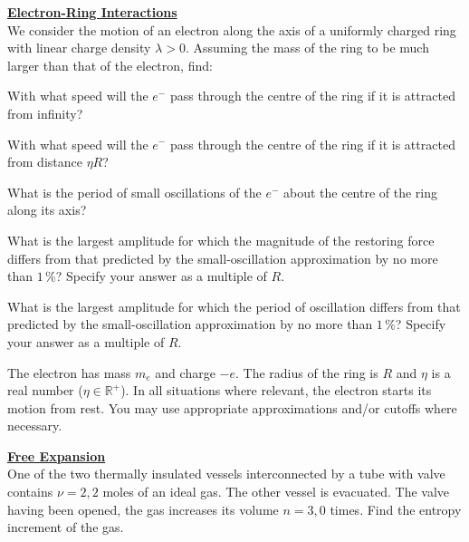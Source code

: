 \documentclass[a4paper]{article}
\begin{document}
	\Problem
	\textbf{\underline{Electron-Ring Interactions}}
	\\
	We consider the motion of an electron along the axis of a uniformly charged ring with linear charge density $\lambda > 0$. Assuming the mass of the ring to be much larger than that of the electron, find:
	\begin{description}[leftmargin=!, labelwidth=\widthof{$\bullet$}]
		\item[$\bullet$] With what speed will the $e^-$ pass through the centre of the ring if it is attracted from infinity?
		\item[$\bullet$] With what speed will the $e^-$ pass through the centre of the ring if it is attracted from distance $\eta R$?
		\item[$\bullet$] What is the period of small oscillations of the $e^-$ about the centre of the ring along its axis?
		\item[$\bullet$] What is the largest amplitude for which the magnitude of the restoring force differs from that predicted by the small-oscillation approximation by no more than $1\,\%$? Specify your answer as a multiple of $R$.
		\item[$\bullet$] What is the largest amplitude for which the period of oscillation differs from that predicted by the small-oscillation approximation by no more than $1\,\%$? Specify your answer as a multiple of $R$.
	\end{description}
	The electron has mass $m_e$ and charge $-e$. The radius of the ring is $R$ and $\eta$ is a real number ($\eta \in \mathbb{R}^+$). In all situations where relevant, the electron starts its motion from rest. You may use appropriate approximations and/or cutoffs where necessary.
	
	\Problem
	\textbf{\underline{Free Expansion}}
	\\
	One of the two thermally insulated vessels interconnected by a tube with valve contains $\nu = 2{,}2$ moles of an ideal gas. The other vessel is evacuated. The valve having been opened, the gas increases its volume $n = 3{,}0$ times. Find the entropy increment of the gas.
	
	
%	
%	
%	
%	
%	
%	

\end{document}
